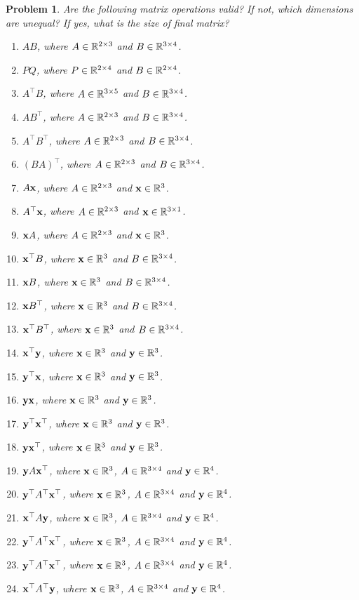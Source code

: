 \documentclass[twocolumn]{article}
\newtheorem{prob}{Problem}
\begin{document}
\begin{prob}
  Are the following matrix operations valid? If not, which dimensions are
unequal? If yes, what is the size of final matrix?
  \begin{enumerate}
  \item $AB$, where $A \in \mathbb{R}^{2 \times 3}$ and $B \in \mathbb{R}^{3 \times 4}$.
  \item $PQ$, where $P \in \mathbb{R}^{2 \times 4}$ and $B \in \mathbb{R}^{2 \times 4}$.
  \item $A^\top B$, where $A \in \mathbb{R}^{3 \times 5}$ and $B \in \mathbb{R}^{3 \times 4}$.
  \item $AB^\top$, where $A \in \mathbb{R}^{2 \times 3}$ and $B \in \mathbb{R}^{3 \times 4}$.
  \item $A^\top B^\top$, where $A \in \mathbb{R}^{2 \times 3}$ and $B \in \mathbb{R}^{3 \times 4}$.
  \item $(BA)^\top$, where $A \in \mathbb{R}^{2 \times 3}$ and $B \in \mathbb{R}^{3 \times 4}$.
  \item $A\mathbf{x}$, where $A \in \mathbb{R}^{2 \times 3}$ and $\mathbf{x} \in \mathbb{R}^{3}$.
  \item $A^\top\mathbf{x}$, where $A \in \mathbb{R}^{2 \times 3}$ and $\mathbf{x} \in \mathbb{R}^{3
      \times 1}$.
  \item $\mathbf{x} A$, where $A \in \mathbb{R}^{2 \times 3}$ and $\mathbf{x} \in \mathbb{R}^{3}$.
  \item $\mathbf{x}^\top B$, where $\mathbf{x} \in \mathbb{R}^{3}$ and $B \in \mathbb{R}^{3 \times 4}$.
  \item $\mathbf{x} B$, where $\mathbf{x} \in \mathbb{R}^{3}$ and $B \in \mathbb{R}^{3 \times 4}$.
  \item $\mathbf{x} B^\top$, where $\mathbf{x} \in \mathbb{R}^{3}$ and $B \in \mathbb{R}^{3 \times 4}$.
  \item $\mathbf{x}^\top B^\top$, where $\mathbf{x} \in \mathbb{R}^{3}$ and $B \in \mathbb{R}^{3 \times 4}$.
  \item $\mathbf{x}^\top \mathbf{y}$, where $\mathbf{x} \in \mathbb{R}^{3}$ and $\mathbf{y} \in \mathbb{R}^{3}$.
  \item $\mathbf{y}^\top \mathbf{x}$, where $\mathbf{x} \in \mathbb{R}^{3}$ and $\mathbf{y} \in \mathbb{R}^{3}$.
  \item $\mathbf{y} \mathbf{x}$, where $\mathbf{x} \in \mathbb{R}^{3}$ and $\mathbf{y} \in \mathbb{R}^{3}$.
  \item $\mathbf{y}^\top \mathbf{x}^\top$, where $\mathbf{x} \in \mathbb{R}^{3}$ and $\mathbf{y} \in \mathbb{R}^{3}$.
  \item $\mathbf{y} \mathbf{x}^\top$, where $\mathbf{x} \in \mathbb{R}^{3}$ and $\mathbf{y} \in \mathbb{R}^{3}$.
  \item $\mathbf{y} A \mathbf{x}^\top$, where $\mathbf{x} \in \mathbb{R}^{3}$, $A \in \mathbb{R}^{3 \times 4}$ and $\mathbf{y} \in \mathbb{R}^{4}$.
  \item $\mathbf{y}^\top A^\top \mathbf{x}^\top$, where $\mathbf{x} \in \mathbb{R}^{3}$, $A \in \mathbb{R}^{3 \times 4}$ and $\mathbf{y} \in \mathbb{R}^{4}$.
  \item $\mathbf{x}^\top A     \mathbf{y}    $, where $\mathbf{x} \in \mathbb{R}^{3}$, $A \in \mathbb{R}^{3 \times 4}$ and $\mathbf{y} \in \mathbb{R}^{4}$.
  \item $\mathbf{y}^\top A^\top \mathbf{x}^\top$, where $\mathbf{x} \in \mathbb{R}^{3}$, $A \in \mathbb{R}^{3 \times 4}$ and $\mathbf{y} \in \mathbb{R}^{4}$.
  \item $\mathbf{y}^\top A^\top \mathbf{x}^\top$, where $\mathbf{x} \in \mathbb{R}^{3}$, $A \in \mathbb{R}^{3 \times 4}$ and $\mathbf{y} \in \mathbb{R}^{4}$.
  \item $\mathbf{x}^\top A^\top \mathbf{y}$, where $\mathbf{x} \in \mathbb{R}^{3}$, $A \in \mathbb{R}^{3 \times 4}$ and $\mathbf{y} \in \mathbb{R}^{4}$.


\end{enumerate}
\end{prob}
\end{document}
